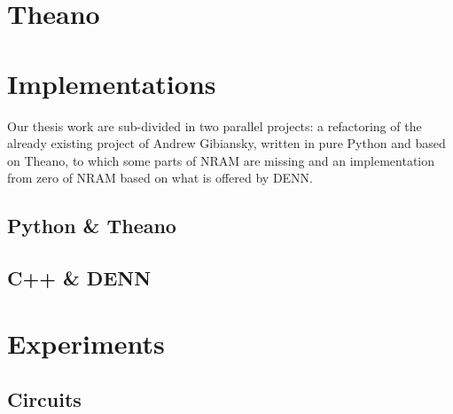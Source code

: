 \section{Theano}


\section{Implementations}
Our thesis work are sub-divided in two parallel projects: a refactoring of the already existing project of Andrew Gibiansky, written in pure Python and based on Theano, to which some parts of NRAM are missing and an implementation from zero of NRAM based on what is offered by DENN.

\subsection{Python \&{} Theano}

\subsection{C++ \&{} DENN}

\section{Experiments}

\subsection{Circuits}